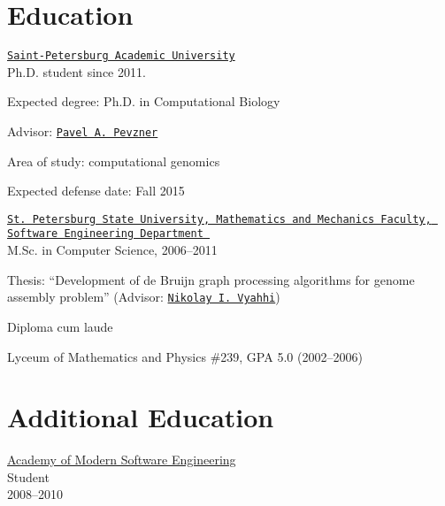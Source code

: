 \section{Education}
%
\href{http://spbau.ru/}{\tt Saint-Petersburg Academic University}\\
  Ph.D. student since 2011. 
\begin{innerlist}
  \item Expected degree: Ph.D. in Computational Biology
  \item Advisor: \href{http://cseweb.ucsd.edu/~ppevzner/}{\tt Pavel A.~Pevzner}
  \item Area of study: computational genomics
  \item Expected defense date: Fall 2015
\end{innerlist}

\blankline 

\href{http://www.math.spbu.ru/en/index.html}{\tt St.~Petersburg State University, Mathematics and Mechanics Faculty, Software Engineering Department 
}\\
  M.Sc. in Computer Science, 2006--2011 %
\begin{innerlist}
  \item Thesis: ``Development of de Bruijn graph processing algorithms
        for genome assembly problem'' (Advisor: \href{http://spbsu.ru/vyahhi/}{\tt Nikolay I.~Vyahhi})
  \item Diploma cum laude
\end{innerlist}

\blankline

Lyceum of Mathematics and Physics \#239, GPA 5.0 (2002--2006)

\section{Additional Education}
\href{http://www.amse.ru/}{Academy of Modern Software Engineering}\\
      Student\\
      2008--2010

\blankline





